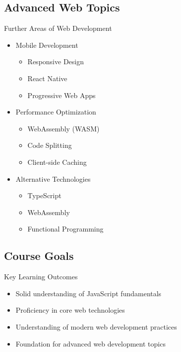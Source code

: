 \subsection{Advanced Web Topics}
\begin{concept}{Further Areas of Web Development}
    \begin{itemize}
        \item Mobile Development
            \begin{itemize}
                \item Responsive Design
                \item React Native
                \item Progressive Web Apps
            \end{itemize}
        \item Performance Optimization
            \begin{itemize}
                \item WebAssembly (WASM)
                \item Code Splitting
                \item Client-side Caching
            \end{itemize}
        \item Alternative Technologies
            \begin{itemize}
                \item TypeScript
                \item WebAssembly 
                \item Functional Programming
            \end{itemize}
    \end{itemize}
\end{concept}

\subsection{Course Goals}
\begin{concept}{Key Learning Outcomes}
    \begin{itemize}
        \item Solid understanding of JavaScript fundamentals
        \item Proficiency in core web technologies
        \item Understanding of modern web development practices
        \item Foundation for advanced web development topics
    \end{itemize}
\end{concept}

